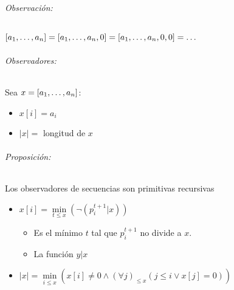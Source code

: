 \paragraph{Observación:} $[a_1,\dots, a_{n}] = [a_1,\dots, a_{n},0] = [a_1,\dots, a_{n},0,0]= \dots$

\paragraph{Observadores:} Sea $x=[a_1,\dots, a_{n}]$:
\begin{itemize}
	\item $x[i] = a_i$
	\item $|x| =$ longitud de $x$
\end{itemize}

\paragraph{Proposición:} Los observadores de secuencias son primitivas recursivas

\begin{demo}
	\begin{itemize}
		\item $x[i] = \min\limits_{t\leq x}\left(\lnot\left(p_i^{t+1}|x\right)\right)$
			\begin{itemize}
				\item [] Es el mínimo $t$ tal que $p_i^{t+1}$ no divide a $x$.
				\item [] La función $y | x$
			\end{itemize}
		\item $|x| = \min\limits_{i\leq x}\left(x[i]\neq 0 \land \left(\forall j\right)_{\leq x} \left(j\leq i \lor x[j] = 0\right)\right)$
	\end{itemize}
\end{demo}
	\section{}
	
	\section{}
	
	\part{}
	
	\section{}
	
